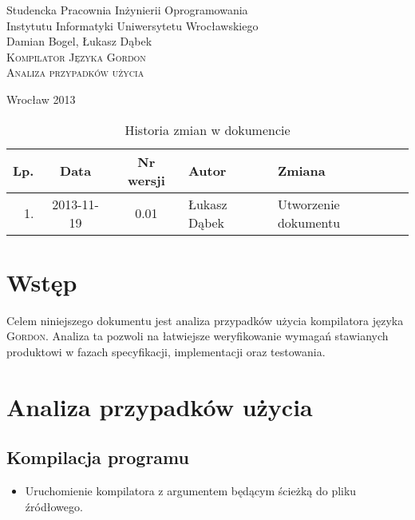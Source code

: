 \documentclass{documentation}
\begin{document}
\begin{titlepage}
\begin{center}
Studencka Pracownia Inżynierii Oprogramowania\\
Instytutu Informatyki Uniwersytetu Wrocławskiego\\[6cm]

Damian Bogel, Łukasz Dąbek\\[1cm]
\textsc{\LARGE Kompilator Języka Gordon}\\[0.5cm]
\textsc{\large Analiza przypadków użycia}

\vfill
Wrocław 2013 \\[2.5cm]

\end{center}
\end{titlepage}

\newpage
\begin{table}
	\centering
	\caption{Historia zmian w dokumencie}
		\begin{tabular}{|r|c|c|l|l|}
		\hline
		Lp.  & Data       & Nr wersji & Autor                 & Zmiana \\ \hline
		1.   & 2013-11-19 & 0.01 & Łukasz Dąbek & Utworzenie dokumentu \\ \hline
	\end{tabular}
\end{table}
\newpage

\tableofcontents
\setcounter{page}{2}

\newpage

\section{Wstęp}
\noindent Celem niniejszego dokumentu jest analiza przypadków użycia kompilatora
języka \textsc{Gordon}. Analiza ta pozwoli na łatwiejsze weryfikowanie wymagań
stawianych produktowi w fazach specyfikacji, implementacji oraz testowania.

\section{Analiza przypadków użycia}
\subsection{Kompilacja programu}
\begin{itemize}
    \item Uruchomienie kompilatora z argumentem będącym ścieżką do pliku źródłowego.
\end{itemize}
\end{document}
